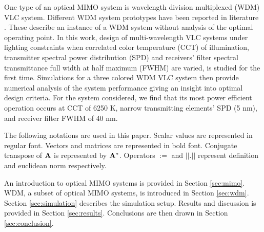One type of an optical MIMO system is wavelength division multiplexed (WDM) VLC system. Different WDM system prototypes have been reported in literature \cite{wan11a,kot12a,cos12a}. These describe an instance of a WDM system without analysis of the optimal operating point. In this work, design of multi-wavelength VLC systems under lighting constraints when correlated color temperature (CCT) of illumination, transmitter spectral power distribution (SPD) and receivers' filter spectral transmittance full width at half maximum (FWHM) are varied, is studied for the first time. Simulations for a three colored WDM VLC system then provide numerical analysis of the system performance giving an insight into optimal design criteria. For the system considered, we find that its most power efficient operation occurs at CCT of 6250 K, narrow transmitting elements' SPD (5 nm), and receiver filter FWHM of 40 nm.

The following notations are used in this paper. Scalar values are represented in regular font. Vectors and matrices are represented in bold font. Conjugate transpose of ${\bf{A}}$ is represented by ${\bf{A}}^{*}$. Operators $:=$ and $||.||$ represent definition and euclidean norm respectively. 

An introduction to optical MIMO systems is provided in Section \ref{sec:mimo}. WDM, a subset of optical MIMO systems, is introduced in Section \ref{sec:wdm}. Section \ref{sec:simulation} describes the simulation setup. Results and discussion is provided in Section \ref{sec:results}. Conclusions are then drawn in Section \ref{sec:conclusion}. 